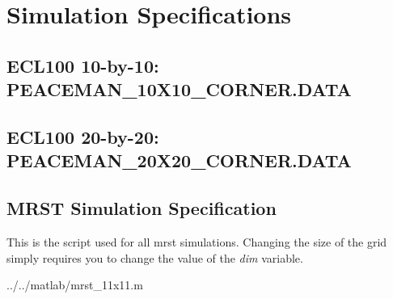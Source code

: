 
\section{Simulation Specifications} %
\label{sec:ecl100_simulation_specifications}

\subsection{ECL100 10-by-10: PEACEMAN\_10X10\_CORNER.DATA} %
\label{sub:peaceman_10x10_data}
{\footnotesize%
}
\clearpage

\subsection{ECL100 20-by-20: PEACEMAN\_20X20\_CORNER.DATA} %
\label{sub:peaceman_20x20_data}
{\footnotesize%
}
\clearpage

\subsection{MRST Simulation Specification} %
\label{sub:mrst_simulation_specification}
This is the script used for all mrst simulations. Changing the size of the grid simply requires you to change the value of the \emph{dim} variable.

  {../../matlab/mrst_11x11.m}

